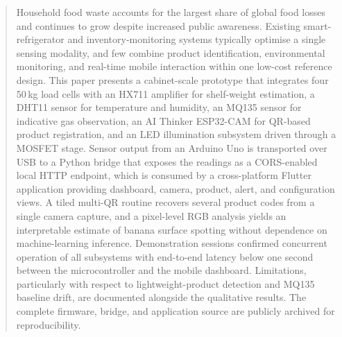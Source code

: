 \begin{abstract}
Household food waste accounts for the largest share of global food
losses and continues to grow despite increased public awareness.
Existing smart-refrigerator and inventory-monitoring systems
typically optimise a single sensing modality, and few combine
product identification, environmental monitoring, and real-time
mobile interaction within one low-cost reference design. This paper
presents a cabinet-scale prototype that integrates four 50\,kg load
cells with an HX711 amplifier for shelf-weight estimation, a DHT11
sensor for temperature and humidity, an MQ135 sensor for indicative
gas observation, an AI Thinker ESP32-CAM for QR-based product
registration, and an LED illumination subsystem driven through a
MOSFET stage. Sensor output from an Arduino Uno is transported over
USB to a Python bridge that exposes the readings as a CORS-enabled
local HTTP endpoint, which is consumed by a cross-platform Flutter
application providing dashboard, camera, product, alert, and
configuration views. A tiled multi-QR routine recovers several
product codes from a single camera capture, and a pixel-level RGB
analysis yields an interpretable estimate of banana surface
spotting without dependence on machine-learning inference.
Demonstration sessions confirmed concurrent operation of all
subsystems with end-to-end latency below one second between the
microcontroller and the mobile dashboard. Limitations, particularly
with respect to lightweight-product detection and MQ135 baseline
drift, are documented alongside the qualitative results. The
complete firmware, bridge, and application source are publicly
archived for reproducibility.
\end{abstract}
